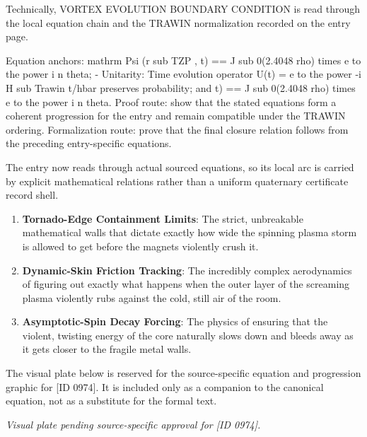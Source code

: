 Technically, VORTEX EVOLUTION BOUNDARY CONDITION is read through the local equation chain and the TRAWIN normalization recorded on the entry page.

Equation anchors: mathrm Psi (r sub TZP , t) == J sub 0(2.4048 rho) times e to the power i n theta; - Unitarity: Time evolution operator U(t) = e to the power -i H sub Trawin t/hbar preserves probability; and t) == J sub 0(2.4048 rho) times e to the power i n theta. Proof route: show that the stated equations form a coherent progression for the entry and remain compatible under the TRAWIN ordering. Formalization route: prove that the final closure relation follows from the preceding entry-specific equations.

The entry now reads through actual sourced equations, so its local arc is carried by explicit mathematical relations rather than a uniform quaternary certificate record shell.
\endgroup

\begin{enumerate}[leftmargin=1.6em,itemsep=6pt,topsep=4pt]
\item \textbf{Tornado-Edge Containment Limits}: The strict, unbreakable mathematical walls that dictate exactly how wide the spinning plasma storm is allowed to get before the magnets violently crush it.
\item \textbf{Dynamic-Skin Friction Tracking}: The incredibly complex aerodynamics of figuring out exactly what happens when the outer layer of the screaming plasma violently rubs against the cold, still air of the room.
\item \textbf{Asymptotic-Spin Decay Forcing}: The physics of ensuring that the violent, twisting energy of the core naturally slows down and bleeds away as it gets closer to the fragile metal walls.
\end{enumerate}

\begingroup\footnotesize\sloppy
The visual plate below is reserved for the source-specific equation and progression graphic for [ID 0974]. It is included only as a companion to the canonical equation, not as a substitute for the formal text.
\par\endgroup
\begingroup\footnotesize\itshape
Visual plate pending source-specific approval for [ID 0974].
\par\endgroup

